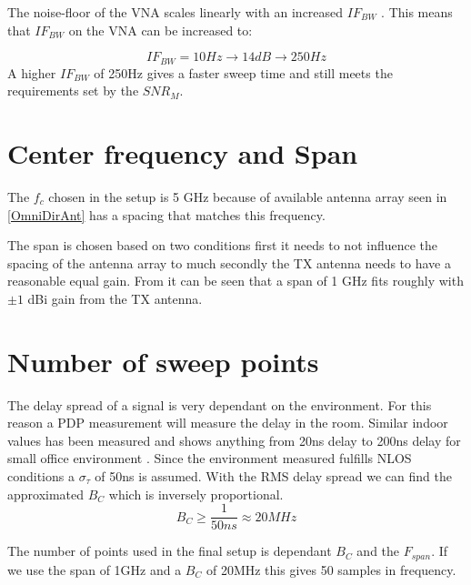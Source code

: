The noise-floor of the \gls{VNA} scales linearly with an increased $IF_{BW}$ \citep{PNA_scale}. This means that $IF_{BW}$ on the \gls{VNA} can be increased to:

\begin{equation}
IF_{BW} = 10Hz \rightarrow 14dB \rightarrow 250Hz
\end{equation}
A higher $IF_{BW}$ of 250Hz  gives a faster sweep time and still meets the requirements set by the $SNR_M$.

\section{Center frequency and Span}
The $f_{c}$ chosen in the setup is 5 GHz  because of available antenna array seen in \autoref{OmniDirAnt} has a spacing that matches this frequency.

The span is chosen based on two conditions first it needs to not influence the spacing of the antenna array to much secondly the TX antenna needs to have a reasonable equal gain. From  it can be seen that a span of 1 GHz fits roughly with $\pm 1$ dBi gain from the TX antenna.


\section{Number of sweep points}
The delay spread of a signal is very dependant on the environment. For this reason a PDP measurement will measure the delay in the room. Similar indoor values has been measured and shows anything from 20ns delay to 200ns delay for small office environment \citep{indoor_delay}. Since the environment measured fulfills NLOS conditions a $\sigma_{\tau}$ of 50ns is assumed. With the RMS delay spread we can find the approximated $B_C$ which is inversely proportional. 
\begin{equation}
B_C \geq \frac{1}{50ns} \approx 20MHz
\label{CohBW1}
\end{equation}

The number of points used in the final setup is dependant $B_C$ and the $F_{span}$. If we use the span of 1GHz and a $B_C$ of 20MHz this gives 50 samples in frequency.

